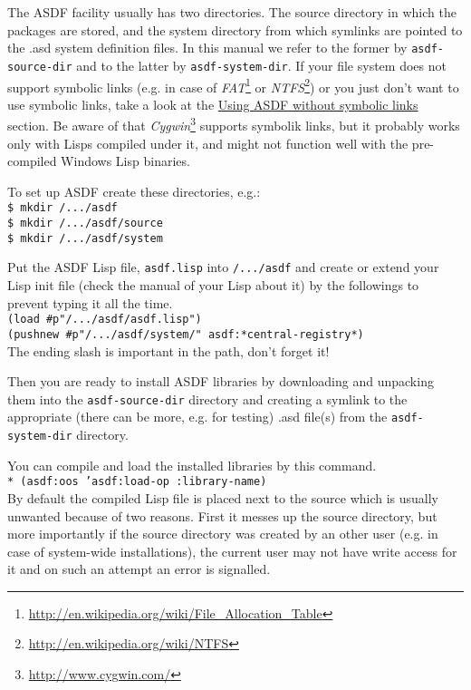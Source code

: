 \documentclass[11pt,a4paper,dvipdfm]{article}
\newcommand{\selfref}[1]{\href{#1}{#1}}
\newcommand{\footref}[2]{\textsl{#1}\footnote{\selfref{#2}}}
\newcommand{\prompttext}[1]{\texttt{#1}}
\newcommand{\shprompt}[1]{\prompttext{\$ #1}}
\newcommand{\lispprompt}[1]{\prompttext{* #1}}
\begin{document}
The ASDF facility usually has two directories. The source directory in which
the packages are stored, and the system directory from which symlinks are
pointed to the .asd system definition files. In this manual we refer to the
former by \prompttext{asdf-source-dir} and to the latter by
\prompttext{asdf-system-dir}. If your file system does not support symbolic
links (e.g. in case of 
\footref{FAT}{http://en.wikipedia.org/wiki/File\_Allocation\_Table} or
\footref{NTFS}{http://en.wikipedia.org/wiki/NTFS}) or you just don't
want to use symbolic links, take a look at the
\hyperlink{nosymlink}{Using ASDF without symbolic links} section. Be aware
of that \footref{Cygwin}{http://www.cygwin.com/} supports symbolik links,
but it probably works only with Lisps compiled under it, and might not
function well with the pre-compiled Windows Lisp binaries.

To set up ASDF create these directories, e.g.: \\
\shprompt{mkdir /.../asdf} \\
\shprompt{mkdir /.../asdf/source} \\
\shprompt{mkdir /.../asdf/system}

Put the ASDF Lisp file, \prompttext{asdf.lisp} into \prompttext{/.../asdf} and
create or extend your Lisp init file (check the manual of your Lisp
about it) by the followings to prevent typing it all the time. \\
\prompttext{(load \#p"/.../asdf/asdf.lisp")} \\
\prompttext{(pushnew \#p"/.../asdf/system/" asdf:*central-registry*)} \\
The ending slash is important in the path, don't forget it!

Then you are ready to install ASDF libraries by downloading and unpacking them
into the \prompttext{asdf-source-dir} directory and creating a symlink to the
appropriate (there can be more, e.g. for testing) .asd file(s) from the
\prompttext{asdf-system-dir} directory.

You can compile and load the installed libraries by this command. \\
\lispprompt{(asdf:oos 'asdf:load-op :library-name)} \\
By default the compiled Lisp file is placed next to the source which is
usually unwanted because of two reasons. First it messes up the source
directory, but more importantly if the source directory was created by an
other user (e.g. in case of system-wide installations), the current user may
not have write access for it and on such an attempt an error is signalled.
\end{document}
